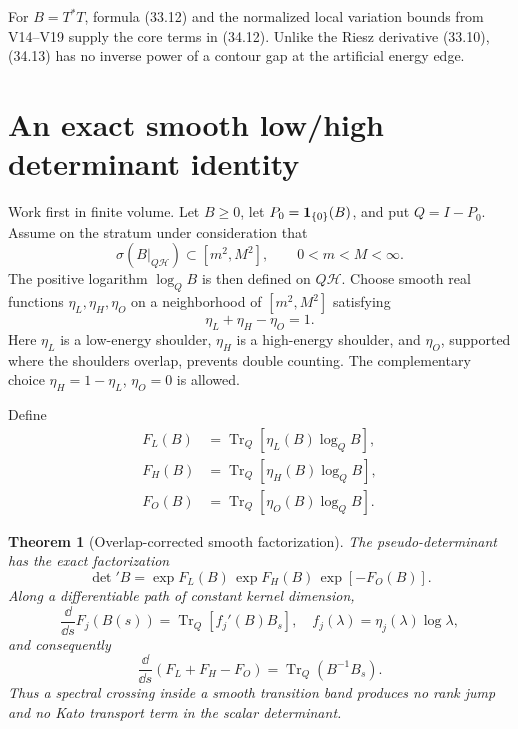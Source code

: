 \documentclass[11pt]{article}
\newtheorem{theorem}{Theorem}[section]
\theoremstyle{remark}
\begin{document}
For \(B=T^*T\), formula (33.12) and the normalized local variation
bounds from V14--V19 supply the core terms in (34.12).  Unlike the
Riesz derivative (33.10), (34.13) has no inverse power of a contour
gap at the artificial energy edge.

\section{An exact smooth low/high determinant identity}

Work first in finite volume.  Let \(B\geq0\), let
\(P_0={\bf1}_{\{0\}}(B)\), and put \(Q=I-P_0\).  Assume on the
stratum under consideration that
\[
 \sigma(B|_{Q\mathcal H})\subset[m^2,M^2],
 \qquad 0<m<M<\infty.                                     \tag{34.16}
\]
The positive logarithm
\(\log_QB\) is then defined on \(Q\mathcal H\).  Choose smooth
real functions \(\eta_L,\eta_H,\eta_O\) on a neighborhood of
\([m^2,M^2]\) satisfying
\[
 \eta_L+\eta_H-\eta_O=1.                                  \tag{34.17}
\]
Here \(\eta_L\) is a low-energy shoulder, \(\eta_H\) is a
high-energy shoulder, and \(\eta_O\), supported where the shoulders
overlap, prevents double counting.  The complementary choice
\(\eta_H=1-\eta_L\), \(\eta_O=0\) is allowed.

Define
\[
 \begin{split}
 F_L(B)&=\operatorname{Tr}_Q
   [\eta_L(B)\log_QB],\\
 F_H(B)&=\operatorname{Tr}_Q
   [\eta_H(B)\log_QB],\\
 F_O(B)&=\operatorname{Tr}_Q
   [\eta_O(B)\log_QB].                                    \tag{34.18}
 \end{split}
\]

\begin{theorem}[Overlap-corrected smooth factorization]
\label{thm:v15v34-factorization}
The pseudo-determinant has the exact factorization
\[
 \boxed{
 \det{}'B
 =\exp F_L(B)\,\exp F_H(B)\,\exp[-F_O(B)].}               \tag{34.19}
\]
Along a differentiable path of constant kernel dimension,
\[
 \frac{\dd}{\dd s}F_j(B(s))
 =\operatorname{Tr}_Q[f_j'(B)B_s],
 \quad f_j(\lambda)=\eta_j(\lambda)\log\lambda,           \tag{34.20}
\]
and consequently
\[
 \frac{\dd}{\dd s}(F_L+F_H-F_O)
 =\operatorname{Tr}_Q(B^{-1}B_s).                          \tag{34.21}
\]
Thus a spectral crossing inside a smooth transition band produces
no rank jump and no Kato transport term in the scalar determinant.
\end{theorem}
\end{document}
